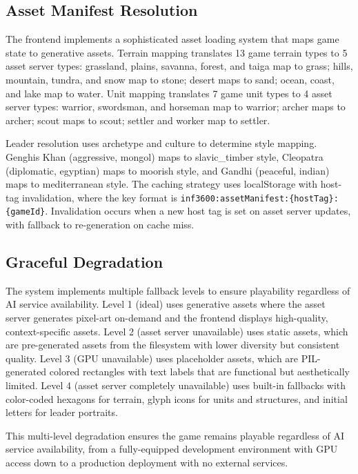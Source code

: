 \documentclass[conference]{IEEEtran}
\begin{document}
\subsection{Asset Manifest Resolution}

The frontend implements a sophisticated asset loading system that maps game state to generative assets. Terrain mapping translates 13 game terrain types to 5 asset server types: grassland, plains, savanna, forest, and taiga map to grass; hills, mountain, tundra, and snow map to stone; desert maps to sand; ocean, coast, and lake map to water. Unit mapping translates 7 game unit types to 4 asset server types: warrior, swordsman, and horseman map to warrior; archer maps to archer; scout maps to scout; settler and worker map to settler.

Leader resolution uses archetype and culture to determine style mapping. Genghis Khan (aggressive, mongol) maps to slavic\_timber style, Cleopatra (diplomatic, egyptian) maps to moorish style, and Gandhi (peaceful, indian) maps to mediterranean style. The caching strategy uses localStorage with host-tag invalidation, where the key format is \texttt{inf3600:assetManifest:\{hostTag\}:\{gameId\}}. Invalidation occurs when a new host tag is set on asset server updates, with fallback to re-generation on cache miss.

\subsection{Graceful Degradation}

The system implements multiple fallback levels to ensure playability regardless of AI service availability. Level 1 (ideal) uses generative assets where the asset server generates pixel-art on-demand and the frontend displays high-quality, context-specific assets. Level 2 (asset server unavailable) uses static assets, which are pre-generated assets from the filesystem with lower diversity but consistent quality. Level 3 (GPU unavailable) uses placeholder assets, which are PIL-generated colored rectangles with text labels that are functional but aesthetically limited. Level 4 (asset server completely unavailable) uses built-in fallbacks with color-coded hexagons for terrain, glyph icons for units and structures, and initial letters for leader portraits.

This multi-level degradation ensures the game remains playable regardless of AI service availability, from a fully-equipped development environment with GPU access down to a production deployment with no external services.
\end{document}
